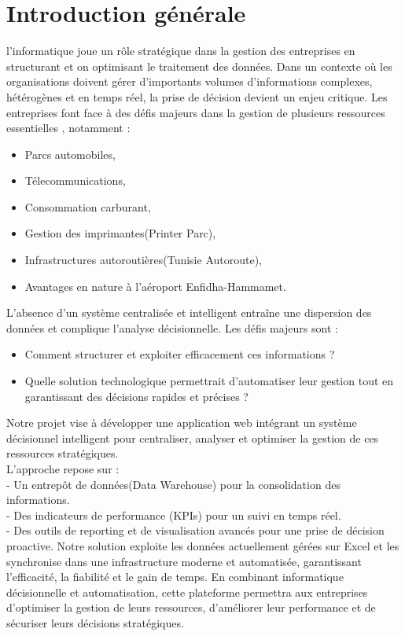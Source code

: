 \documentclass[a4paper,11pt]{report}
\begin{document}
\section*{ Introduction générale}
l'informatique joue un rôle stratégique dans la gestion des entreprises en structurant et on optimisant le traitement des données. Dans un contexte où les organisations doivent gérer d'importants volumes d'informations complexes, hétérogènes et en temps réel, la prise de décision devient un enjeu critique.
\newline
Les entreprises font face à des défis majeurs dans la gestion de plusieurs ressources essentielles , notamment : 
\begin{itemize}
	\item Parcs automobiles,
	\item Télecommunications,
	\item Consommation carburant,
	\item Gestion des imprimantes(Printer Parc),
	\item Infrastructures autoroutières(Tunisie Autoroute),
	\item Avantages en nature à l'aéroport Enfidha-Hammamet.
\end{itemize}
L'absence d'un système centralisée et intelligent entraîne une dispersion des données et complique l'analyse décisionnelle. Les défis majeurs sont :
\begin{itemize}
	\item Comment structurer et exploiter efficacement ces informations ?
	\item Quelle solution technologique permettrait d'automatiser leur gestion tout en garantissant des décisions rapides et précises ?
\end{itemize}
Notre projet vise à développer une application web intégrant un système décisionnel intelligent pour centraliser, analyser et optimiser la gestion de ces ressources stratégiques.\\
L'approche repose sur :\\
  	 - Un entrepôt de données(Data Warehouse) pour la consolidation des informations.\\
  	 - Des indicateurs de performance (KPIs) pour un suivi en temps réel.\\
  	 - Des outils de reporting et de visualisation avancés pour une prise de décision proactive. 
\vspace{0.2cm}
\newline
Notre solution exploite les données actuellement gérées sur Excel et les synchronise dans une infrastructure moderne et automatisée, garantissant l'efficacité, la fiabilité et le gain de temps.
\vspace{0.2cm}
\newline
En combinant informatique décisionnelle et automatisation, cette plateforme permettra aux entreprises d'optimiser la gestion de leurs ressources, d'améliorer leur performance et de sécuriser leurs décisions stratégiques.
\newpage
\end{document}
